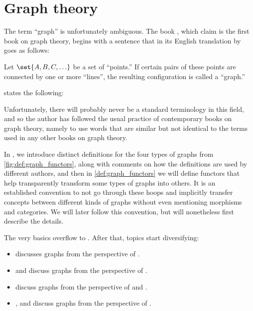 \chapter{Graph theory}\label{ch:graph_theory}

\begin{remark}\label{rem:graph_definition}
  The term \enquote{graph} is unfortunately ambiguous. The book \cite{König1986Graphentheorie}, which  claim is the first book on graph theory, begins with a sentence that in its English translation by  goes as follows:
  \begin{displayquote}
    Let \( \set{ A, B, C, \ldots } \) be a set of \enquote{points.} If certain pairs of these points are connected by one or more \enquote{lines}, the resulting configuration is called a \enquote{graph.}
  \end{displayquote}

   states the following:
  \begin{displayquote}
    Unfortunately, there will probably never be a standard terminology in this field, and so the author has followed the usual practice of contemporary books on graph theory, namely to use words that are similar but not identical to the terms used in any other books on graph theory.
  \end{displayquote}
\end{remark}

In , we introduce distinct definitions for the four types of graphs from \cref{fig:def:graph_functors}, along with comments on how the definitions are used by different authors, and then in \cref{def:graph_functors} we will define functors that help transparently transform some types of graphs into others. It is an established convention to not go through these hoops and implicitly transfer concepts between different kinds of graphs without even mentioning morphisms and categories. We will later follow this convention, but will nonetheless first describe the details.

The very basics overflow to . After that, topics start diversifying:
\begin{itemize}
  \item {} discusses graphs from the perspective of .
  \item {} and  discuss graphs from the perspective of .
  \item {} discuss graphs from the perspective of  and .
  \item {},  and  discuss graphs from the perspective of .
\end{itemize}

